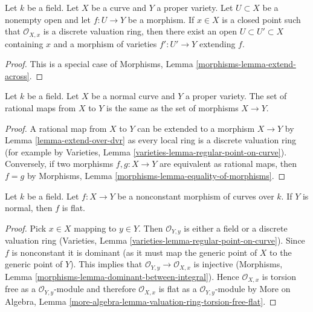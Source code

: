 \begin{lemma}
\label{lemma-extend-over-dvr}
Let $k$ be a field. Let $X$ be a curve and $Y$ a proper variety.
Let $U \subset X$ be a nonempty open and let $f : U \to Y$ be a morphism.
If $x \in X$ is a closed point such that $\mathcal{O}_{X, x}$
is a discrete valuation ring, then there exist an open
$U \subset U' \subset X$ containing $x$ and a morphism of
varieties $f' : U' \to Y$ extending $f$.
\end{lemma}

\begin{proof}
This is a special case of
Morphisms, Lemma \ref{morphisms-lemma-extend-across}.
\end{proof}

\begin{lemma}
\label{lemma-extend-over-normal-curve}
Let $k$ be a field. Let $X$ be a normal curve and $Y$ a proper variety.
The set of rational maps from $X$ to $Y$ is the same as the set
of morphisms $X \to Y$.
\end{lemma}

\begin{proof}
A rational map from $X$ to $Y$ can be extended to a morphism $X \to Y$
by Lemma \ref{lemma-extend-over-dvr}
as every local ring is a discrete valuation ring
(for example by Varieties, Lemma \ref{varieties-lemma-regular-point-on-curve}).
Conversely, if two morphisms $f,g: X \to Y$ are equivalent as rational maps,
then  $f = g$ by Morphisms, Lemma \ref{morphisms-lemma-equality-of-morphisms}.
\end{proof}

\begin{lemma}
\label{lemma-flat}
Let $k$ be a field. Let $f : X \to Y$ be a nonconstant morphism
of curves over $k$. If $Y$ is normal, then $f$ is flat.
\end{lemma}

\begin{proof}
Pick $x \in X$ mapping to $y \in Y$. Then $\mathcal{O}_{Y, y}$ is either a
field or a discrete valuation ring
(Varieties, Lemma \ref{varieties-lemma-regular-point-on-curve}).
Since $f$ is nonconstant it is dominant (as it must map the
generic point of $X$ to the generic point of $Y$). This implies that
$\mathcal{O}_{Y, y} \to \mathcal{O}_{X, x}$ is injective
(Morphisms, Lemma \ref{morphisms-lemma-dominant-between-integral}).
Hence $\mathcal{O}_{X, x}$ is torsion free as a $\mathcal{O}_{Y, y}$-module
and therefore $\mathcal{O}_{X, x}$ is flat as a $\mathcal{O}_{Y, y}$-module
by More on Algebra, Lemma
\ref{more-algebra-lemma-valuation-ring-torsion-free-flat}.
\end{proof}

